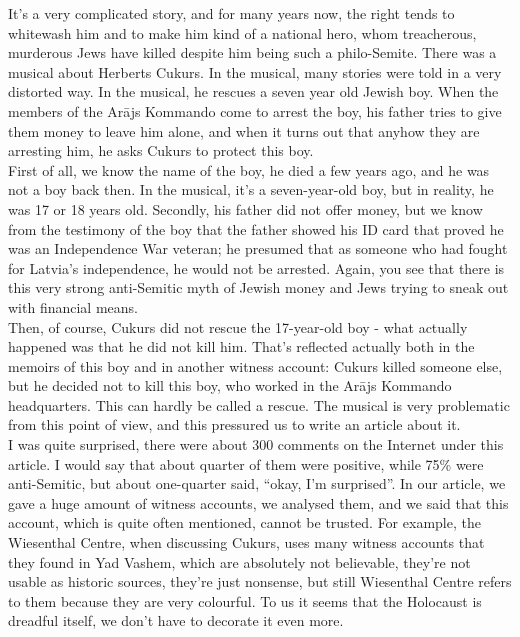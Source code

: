 It’s a very complicated story, and for many years now, the right tends to whitewash him and to make him kind of a national hero, whom treacherous, murderous Jews have killed despite him being such a philo-Semite. There was a musical about Herberts Cukurs. In the musical, many stories were told in a very distorted way. In the musical, he rescues a seven year old Jewish boy. When the members of the Arājs Kommando come to arrest the boy, his father tries to give them money to leave him alone, and when it turns out that anyhow they are arresting him, he asks Cukurs to protect this boy.\\
First of all, we know the name of the boy, he died a few years ago, and he was not a boy back then. In the musical, it's a seven-year-old boy, but in reality, he was 17 or 18 years old. Secondly, his father did not offer money, but we know from the testimony of the boy that the father showed his ID card that proved he was an Independence War veteran; he presumed that as someone who had fought for Latvia's independence, he would not be arrested. Again, you see that there is this very strong anti-Semitic myth of Jewish money and Jews trying to sneak out with financial means.\\
Then, of course, Cukurs did not rescue the 17-year-old boy - what actually happened was that he did not kill him. That’s reflected actually both in the memoirs of this boy and in another witness account: Cukurs killed someone else, but he decided not to kill this boy, who worked in the Arājs Kommando headquarters. This can hardly be called a rescue. The musical is very problematic from this point of view, and this pressured us to write an article about it.\\
I was quite surprised, there were about 300 comments on the Internet under this article. I would say that about quarter of them were positive, while 75\% were anti-Semitic, but about one-quarter said, ``okay, I'm surprised''. In our article, we gave a huge amount of witness accounts, we analysed them, and we said that this account, which is quite often mentioned, cannot be trusted. For example, the Wiesenthal Centre, when discussing Cukurs, uses many witness accounts that they found in Yad Vashem, which are absolutely not believable, they're not usable as historic sources, they're just nonsense, but still Wiesenthal Centre refers to them because they are very colourful. To us it seems that the Holocaust is dreadful itself, we don't have to decorate it even more.\\
